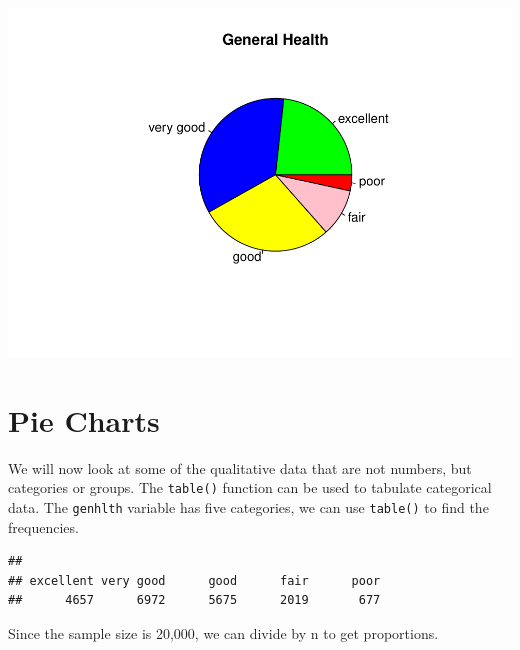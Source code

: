\documentclass[
]{book}
\newenvironment{Shaded}{\begin{snugshade}}{\end{snugshade}}
\newcommand{\DecValTok}[1]{\textcolor[rgb]{0.00,0.00,0.81}{#1}}
\newcommand{\KeywordTok}[1]{\textcolor[rgb]{0.13,0.29,0.53}{\textbf{#1}}}
\newcommand{\NormalTok}[1]{#1}
\newcommand{\OperatorTok}[1]{\textcolor[rgb]{0.81,0.36,0.00}{\textbf{#1}}}
\begin{document}
\includegraphics{_main_files/figure-latex/unnamed-chunk-138-1.pdf}

\hypertarget{pie-charts}{%
\section{Pie Charts}\label{pie-charts}}

We will now look at some of the qualitative data that are not numbers, but categories or groups. The \texttt{table()} function can be used to tabulate categorical data. The \texttt{genhlth} variable has five categories, we can use \texttt{table()} to find the frequencies.

\begin{Shaded}
\end{Shaded}

\begin{verbatim}
## 
## excellent very good      good      fair      poor 
##      4657      6972      5675      2019       677
\end{verbatim}

Since the sample size is 20,000, we can divide by n to get proportions.

\begin{Shaded}
\end{Shaded}
\end{document}
